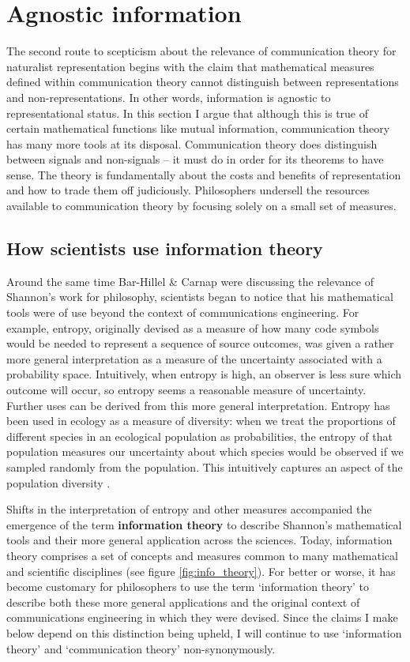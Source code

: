 \section{Agnostic information}\label{sec:agnostic}

The second route to scepticism about the relevance of communication theory for naturalist representation begins with the claim that mathematical measures defined within communication theory cannot distinguish between representations and non-representations.
In other words, information is agnostic to representational status.
In this section I argue that although this is true of certain mathematical functions like mutual information, communication theory has many more tools at its disposal.
Communication theory does distinguish between signals and non-signals -- it must do in order for its theorems to have sense.
The theory is fundamentally about the costs and benefits of representation and how to trade them off judiciously.
Philosophers undersell the resources available to communication theory by focusing solely on a small set of measures.

\subsection{How scientists use information theory}\label{subsec:scientists}

Around the same time Bar-Hillel \& Carnap were discussing the relevance of Shannon's work for philosophy, scientists began to notice that his mathematical tools were of use beyond the context of communications engineering.
For example, entropy, originally devised as a measure of how many code symbols would be needed to represent a sequence of source outcomes, was given a rather more general interpretation as a measure of the uncertainty associated with a probability space.
Intuitively, when entropy is high, an observer is less sure which outcome will occur, so entropy seems a reasonable measure of uncertainty.
Further uses can be derived from this more general interpretation.
Entropy has been used in ecology as a measure of diversity: when we treat the proportions of different species in an ecological population as probabilities, the entropy of that population measures our uncertainty about which species would be observed if we sampled randomly from the population.
This intuitively captures an aspect of the population diversity \citep{margalef1957information}.

Shifts in the interpretation of entropy and other measures accompanied the emergence of the term \textbf{information theory} to describe Shannon's mathematical tools and their more general application across the sciences.
Today, information theory comprises a set of concepts and measures common to many mathematical and scientific disciplines (see figure \ref{fig:info_theory}).
For better or worse, it has become customary for philosophers to use the term `information theory' to describe both these more general applications and the original context of communications engineering in which they were devised.
Since the claims I make below depend on this distinction being upheld, I will continue to use `information theory' and `communication theory' non-synonymously.

